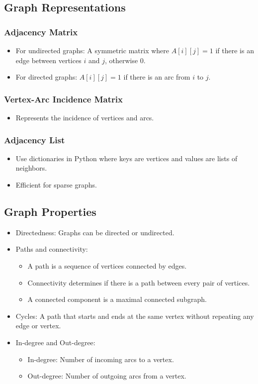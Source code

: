 \documentclass[10pt]{article}
\begin{document}
\subsection{Graph Representations}
\subsubsection{Adjacency Matrix}
\begin{itemize}
    \item For undirected graphs: A symmetric matrix where \( A[i][j] = 1 \) if there is an edge between vertices \( i \) and \( j \), otherwise \( 0 \).
    \item For directed graphs: \( A[i][j] = 1 \) if there is an arc from \( i \) to \( j \).
\end{itemize}

\subsubsection{Vertex-Arc Incidence Matrix}
\begin{itemize}
    \item Represents the incidence of vertices and arcs.
\end{itemize}

\subsubsection{Adjacency List}
\begin{itemize}
    \item Use dictionaries in Python where keys are vertices and values are lists of neighbors.
    \item Efficient for sparse graphs.
\end{itemize}

\subsection{Graph Properties}
\begin{itemize}
    \item Directedness: Graphs can be directed or undirected.
    \item Paths and connectivity:
    \begin{itemize}
        \item A path is a sequence of vertices connected by edges.
        \item Connectivity determines if there is a path between every pair of vertices.
        \item A connected component is a maximal connected subgraph.
    \end{itemize}
    \item Cycles: A path that starts and ends at the same vertex without repeating any edge or vertex.
    \item In-degree and Out-degree:
    \begin{itemize}
        \item In-degree: Number of incoming arcs to a vertex.
        \item Out-degree: Number of outgoing arcs from a vertex.
    \end{itemize}
\end{itemize}
\end{document}
